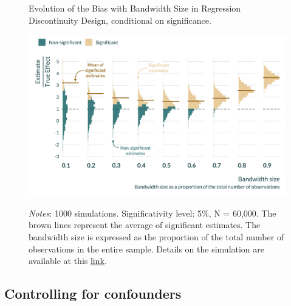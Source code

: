 \documentclass[usletter, 12pt]{article}
\begin{document}
       			 \begin{figure}[!h] 
				\begin{center}
					\caption{Evolution of the Bias with Bandwidth Size in Regression Discontinuity Design, conditional on significance.}
					\label{graph_RDD}
					\includegraphics[width=0.8\linewidth]{images/main_graph_RDD_paper_annotated.pdf}
		      			\caption*{\footnotesize \textit{Notes}: 1000 simulations. Significativity level: 5\%, N = 60,000. The brown lines represent the average of significant estimates. The bandwidth size is expressed as the proportion of the total number of observations in the entire sample. Details on the simulation are available at this \href{https://vincentbagilet.github.io/causal_exaggeration/RDD.html}{link}.}
				\end{center}
				\vspace{-1cm}
			\end{figure} 
		

		
		
		
		 \subsection{Controlling for confounders}
		
\end{document}
